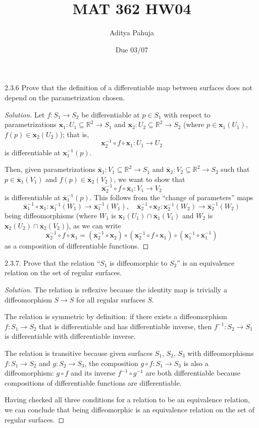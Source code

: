 \documentclass[10pt]{scrartcl}
\title{\vspace{-2em}MAT 362 HW04}
\author{\large Aditya Pahuja}
\date{\large Due 03/07}
\providecommand{\ol}{\overline}
\providecommand{\RR}{\mathbb R}
\providecommand{\inv}{^{-1}}
\providecommand{\mb}[1]{\mathbf{#1}}
\newenvironment{soln}{\begin{proof}[Solution]}{\end{proof}}
\begin{document}
\maketitle

\begin{problem*}2.3.6
	Prove that the definition of a differentiable map between surfaces
	does not depend on the parametrization chosen.
\end{problem*}

\begin{soln}
	Let $f\colon S_1\to S_2$ be differentiable at $p\in S_1$
	with respect to parametrizations
	$\mb x_1\colon U_1\subseteq\RR^2\to S_1$ and
	$\mb x_2\colon U_2\subseteq\RR^2\to S_2$
	(where $p\in \mb x_1(U_1)$, $f(p)\in \mb x_2(U_2)$); that is,
	\[\mb x_2\inv \circ f\circ\mb x_1\colon U_1\to U_2\]
	is differentiable at $\mb x_1\inv(p)$.
	
	Then, given parametrizations $\ol{\mb x}_1\colon V_1\subseteq\RR^2\to S_1$
	and $\ol{\mb x}_2\colon V_2\subseteq\RR^2\to S_2$
	such that $p\in\ol{\mb x}_1(V_1)$ and $f(p)\in\ol{\mb x}_2(V_2)$,
	we want to show that
	\[\ol{\mb x}_2\inv\circ f\circ\ol{\mb x}_1\colon V_1\to V_2\]
	is differentiable at $\ol{\mb x}_1\inv(p)$.
	This follows from the ``change of parameters'' maps
	\[\ol{\mb x}_1\inv\circ\mb x_1\colon \mb x_1\inv(W_1)\to
	\ol{\mb x}_1\inv (W_1),\quad
	\ol{\mb x}_2\inv\circ\mb x_2\colon \mb x_2\inv(W_2)\to
	\ol{\mb x}_2\inv (W_2)\]
	being diffeomorphisms
	(where $W_1$ is $\mb x_1(U_1)\cap\ol{\mb x}_1(V_1)$ and
	$W_2$ is $\mb x_2(U_2)\cap\ol{\mb x}_2(V_2)$), as we can write
	\[\ol{\mb x}_2\inv\circ f\circ\ol{\mb x}_1
	= (\ol{\mb x}_2\inv\circ\mb x_2)\circ
	(\mb x_2\inv \circ f\circ\mb x_1)\circ
	(\mb x_1\inv\circ\ol{\mb x}_1\inv)\]
	as a composition of differentiable functions.
\end{soln}

\begin{problem*}2.3.7.
	Prove that the relation ``$S_1$ is diffeomorphic to $S_2$''
	is an equivalence relation on the set of regular surfaces.
\end{problem*}

\begin{soln}
	The relation is reflexive because the identity map
	is trivially a diffeomorphism $S\to S$ for all regular surfaces $S$.
	
	The relation is symmetric by definition:
	if there exists a diffeomorphism $f\colon S_1\to S_2$
	that is differentiable and has differentiable inverse,
	then $f\inv\colon S_2\to S_1$ is
	differentiable with differentiable inverse.
	
	The relation is transitive because
	given surfaces $S_1$, $S_2$, $S_3$ with diffeomorphisms
	$f\colon S_1\to S_2$ and $g\colon S_2\to S_3$,
	the composition $g\circ f\colon S_1\to S_3$ is also a diffeomorphism:
	$g\circ f$ and its inverse $f\inv\circ g\inv$ are both differentiable
	because compositions of differentiable functions are differentiable.

	Having checked all three conditions for a relation to be
	an equivalence relation, we can conclude that being diffeomorphic
	is an equivalence relation on the set of regular surfaces.
\end{soln}
\end{document}
